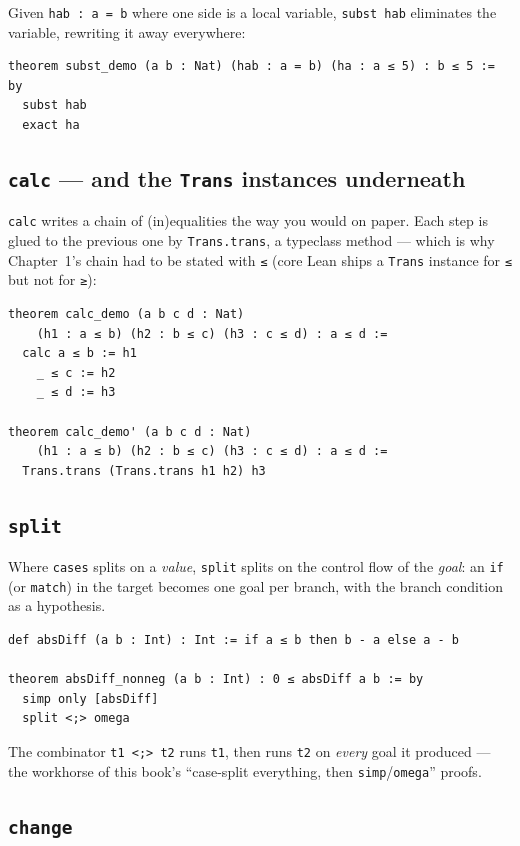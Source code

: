 \documentclass[12pt, a4paper, openright]{book}
\theoremstyle{thmstyle}
\theoremstyle{defstyle}
\newcommand{\lc}[1]{\texttt{#1}}
\begin{document}
Given \lc{hab : a = b} where one side is a local variable, \lc{subst hab}
eliminates the variable, rewriting it away everywhere:

\begin{verbatim}
theorem subst_demo (a b : Nat) (hab : a = b) (ha : a ≤ 5) : b ≤ 5 := by
  subst hab
  exact ha
\end{verbatim}

\subsection*{\lc{calc} --- and the \lc{Trans} instances underneath}

\lc{calc} writes a chain of (in)equalities the way you would on paper.
Each step is glued to the previous one by \lc{Trans.trans}, a typeclass
method --- which is why Chapter~1's chain had to be stated with \lc{≤}
(core Lean ships a \lc{Trans} instance for \lc{≤} but not for \lc{≥}):

\begin{verbatim}
theorem calc_demo (a b c d : Nat)
    (h1 : a ≤ b) (h2 : b ≤ c) (h3 : c ≤ d) : a ≤ d :=
  calc a ≤ b := h1
    _ ≤ c := h2
    _ ≤ d := h3

theorem calc_demo' (a b c d : Nat)
    (h1 : a ≤ b) (h2 : b ≤ c) (h3 : c ≤ d) : a ≤ d :=
  Trans.trans (Trans.trans h1 h2) h3
\end{verbatim}

\subsection*{\lc{split}}

Where \lc{cases} splits on a \emph{value}, \lc{split} splits on the
control flow of the \emph{goal}: an \lc{if} (or \lc{match}) in the target
becomes one goal per branch, with the branch condition as a hypothesis.

\begin{verbatim}
def absDiff (a b : Int) : Int := if a ≤ b then b - a else a - b

theorem absDiff_nonneg (a b : Int) : 0 ≤ absDiff a b := by
  simp only [absDiff]
  split <;> omega
\end{verbatim}

The combinator \lc{t1 <;> t2} runs \lc{t1}, then runs \lc{t2} on
\emph{every} goal it produced --- the workhorse of this book's
``case-split everything, then \lc{simp}/\lc{omega}'' proofs.

\subsection*{\lc{change}}
\end{document}
